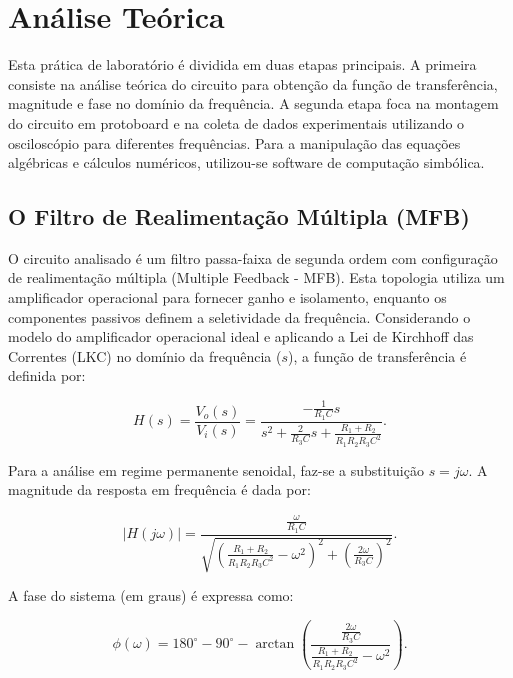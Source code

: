 \chapter{Análise Teórica}

Esta prática de laboratório é dividida em duas etapas principais. A primeira consiste na análise teórica do circuito para obtenção da função de transferência, magnitude e fase no domínio da frequência. A segunda etapa foca na montagem do circuito em protoboard e na coleta de dados experimentais utilizando o osciloscópio para diferentes frequências. Para a manipulação das equações algébricas e cálculos numéricos, utilizou-se software de computação simbólica.

\section{O Filtro de Realimentação Múltipla (MFB)}

O circuito analisado é um filtro passa-faixa de segunda ordem com configuração de realimentação múltipla (Multiple Feedback - MFB). Esta topologia utiliza um amplificador operacional para fornecer ganho e isolamento, enquanto os componentes passivos definem a seletividade da frequência. Considerando o modelo do amplificador operacional ideal e aplicando a Lei de Kirchhoff das Correntes (LKC) no domínio da frequência ($s$), a função de transferência é definida por:

\begin{equation}
	H(s) = \frac{V_o(s)}{V_i(s)} = \frac{-\frac{1}{R_1 C} s}{s^2 + \frac{2}{R_3 C} s + \frac{R_1 + R_2}{R_1 R_2 R_3 C^2}}.
	\label{eq:transfer_function}
\end{equation}

Para a análise em regime permanente senoidal, faz-se a substituição $s = j\omega$. A magnitude da resposta em frequência é dada por:

\begin{equation}
	|H(j\omega)| = \frac{\frac{\omega}{R_1 C}}{\sqrt{ \left( \frac{R_1 + R_2}{R_1 R_2 R_3 C^2} - \omega^2 \right)^2 + \left( \frac{2\omega}{R_3 C} \right)^2 }}.
	\label{eq:magnitude}
\end{equation}

A fase do sistema (em graus) é expressa como:

\begin{equation}
	\phi(\omega) = 180^\circ - 90^\circ - \arctan \left( \frac{\frac{2\omega}{R_3 C}}{\frac{R_1 + R_2}{R_1 R_2 R_3 C^2} - \omega^2} \right).
	\label{eq:phase}
\end{equation}

